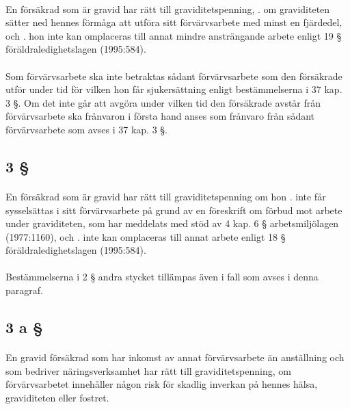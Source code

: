 \documentclass[a4paper,notitlepage,openany,10pt]{book}
\begin{document}
\paragraph*{}
En försäkrad som är gravid har rätt till graviditetspenning,
. om graviditeten sätter ned hennes förmåga att utföra sitt förvärvsarbete med minst en fjärdedel, och
. hon inte kan omplaceras till annat mindre ansträngande arbete enligt 19 § föräldraledighetslagen (1995:584).
\paragraph*{}
Som förvärvsarbete ska inte betraktas sådant förvärvsarbete som den försäkrade utför under tid för vilken hon får sjukersättning enligt bestämmelserna i 37 kap. 3 §. Om det inte går att avgöra under vilken tid den försäkrade avstår från förvärvsarbete ska frånvaron i första hand anses som frånvaro från sådant förvärvsarbete som avses i 37 kap. 3 §.
\subsection*{3 §}
\paragraph*{}
En försäkrad som är gravid har rätt till graviditetspenning om hon
. inte får sysselsättas i sitt förvärvsarbete på grund av en föreskrift om förbud mot arbete under graviditeten, som har meddelats med stöd av 4 kap. 6 § arbetsmiljölagen (1977:1160), och
. inte kan omplaceras till annat arbete enligt 18 § föräldraledighetslagen (1995:584).
\paragraph*{}
Bestämmelserna i 2 § andra stycket tillämpas även i fall som avses i denna paragraf.
\subsection*{3 a §}
\paragraph*{}
En gravid försäkrad som har inkomst av annat förvärvsarbete än anställning och som bedriver näringsverksamhet har rätt till graviditetspenning, om förvärvsarbetet innehåller någon risk för skadlig inverkan på hennes hälsa, graviditeten eller fostret.
\end{document}
